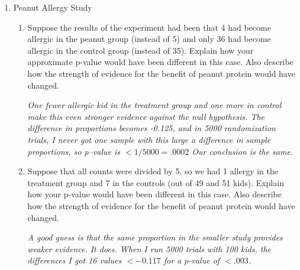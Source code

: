 \begin{enumerate}
    
\item Peanut Allergy Study
  \begin{enumerate}
  \item  Suppose the results of the experiment had been that 4 had
    become allergic in the peanut group (instead of 5) and only 36 had
    become allergic in the control group (instead of 35).  Explain how your
    approximate p-value would have been different in this case.  Also
    describe how the strength of evidence for the benefit of peanut protein
    would have changed.
\begin{students}
  \vspace{2cm}
\end{students}  

\begin{key}
  {\it  One fewer allergic kid in the treatment group and one more
     in control make this even stronger evidence against the null
     hypothesis. The difference in proportions becomes -0.125, and in 5000
     randomization trials, I never got one sample with this large a
     difference in sample proportions, so p--value is $< 1/5000 =
     .0002$  Our conclusion is the same.
  }
\end{key}

\item Suppose that all counts were divided by 5, so we had 1 allergy
  in the treatment group and 7 in the controls (out of 49 and 51
  kids).  Explain how your p-value would have been different in this
  case.  Also describe how the strength of evidence for the benefit of
  peanut protein would have changed.  
\begin{students}
  \vspace*{\fill}
  \newpage
\end{students}

\begin{key}
   {\it A good guess is that the same proportion in the smaller study
     provides weaker evidence. It does.  When I run 5000 trials with
     100 kids, the differences I got 16 values $< -0.117$ for a
     p-value of  $< .003$.}
\end{key}
  \end{enumerate}





\end{enumerate}
